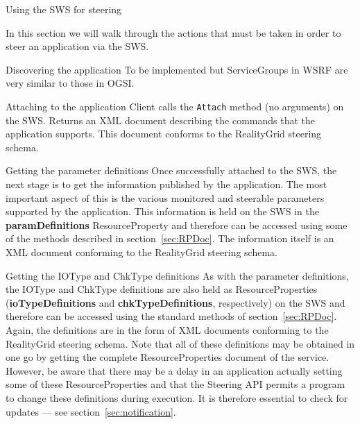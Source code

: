 \documentclass[a4paper]{article}
\begin{document}
\begin{section}{Using the SWS for steering}
\label{sec:sws_steering}

In this section we will walk through the actions that must be taken in
order to steer an application via the SWS.

\begin{subsection}{Discovering the application}
To be implemented but ServiceGroups in WSRF are very similar to those
in OGSI.
\end{subsection}

\begin{subsection}{Attaching to the application}
Client calls the \texttt{Attach} method (no arguments) on the SWS.
Returns an XML document describing the commands that the application
supports.  This document conforms to the RealityGrid steering schema.
\end{subsection}

\begin{subsection}{Getting the parameter definitions}
Once successfully attached to the SWS, the next stage is to get the
information published by the application.  The most important aspect
of this is the various monitored and steerable parameters supported by
the application.  This information is held on the SWS in the {\bf
paramDefinitions} ResourceProperty and therefore can be accessed using
some of the methods described in section~\ref{sec:RPDoc}.  The
information itself is an XML document conforming to the RealityGrid
steering schema.
\end{subsection}

\begin{subsection}{Getting the IOType and ChkType definitions}
As with the parameter definitions, the IOType and ChkType definitions
are also held as ResourceProperties ({\bf ioTypeDefinitions} and {\bf
chkTypeDefinitions}, respectively) on the SWS and therefore can be
accessed using the standard methods of section~\ref{sec:RPDoc}.
Again, the definitions are in the form of XML documents conforming to
the RealityGrid steering schema.  Note that all of these definitions
may be obtained in one go by getting the complete ResourceProperties
document of the service.  However, be aware that there may be a delay
in an application actually setting some of these ResourceProperties
and that the Steering API permits a program to change these
definitions during execution.  It is therefore essential to check for
updates --- see section~\ref{sec:notification}.
\end{subsection}


\end{section}
\end{document}
